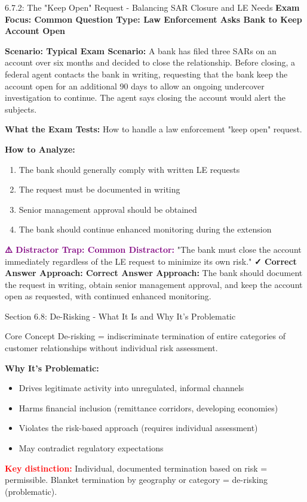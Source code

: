 \documentclass[11pt,a4paper]{beamer}
\newcommand{\redflag}[1]{\textcolor{red}{\textbf{#1}}}
\newcommand{\examfocus}[1]{\textcolor{orange!80!black}{\textbf{Exam Focus: #1}}}
\newcommand{\trap}[1]{\textcolor{purple}{\textbf{⚠️ Distractor Trap: #1}}}
\newcommand{\correct}[1]{\textcolor{green!50!black}{\textbf{✓ Correct Answer Approach: #1}}}
\newcommand{\scenario}[1]{\textcolor{blue!70!black}{\textbf{Scenario: #1}}}
\begin{document}
	\begin{frame}{6.7.2: The "Keep Open" Request - Balancing SAR Closure and LE Needs}
		\examfocus{Common Question Type: Law Enforcement Asks Bank to Keep Account Open}
		
		\scenario{Typical Exam Scenario:}
		A bank has filed three SARs on an account over six months and decided to close the relationship. Before closing, a federal agent contacts the bank in writing, requesting that the bank keep the account open for an additional 90 days to allow an ongoing undercover investigation to continue. The agent says closing the account would alert the subjects.
		
		\textbf{What the Exam Tests:} How to handle a law enforcement "keep open" request.
		
		\textbf{How to Analyze:}
		\begin{enumerate}
			\item The bank should generally comply with written LE requests
			\item The request must be documented in writing
			\item Senior management approval should be obtained
			\item The bank should continue enhanced monitoring during the extension
		\end{enumerate}
		
		\trap{Common Distractor:} "The bank must close the account immediately regardless of the LE request to minimize its own risk."
		\correct{Correct Answer Approach:} The bank should document the request in writing, obtain senior management approval, and keep the account open as requested, with continued enhanced monitoring.
	\end{frame}
	
	
	\begin{frame}{Section 6.8: De-Risking - What It Is and Why It's Problematic}
		\begin{block}{Core Concept}
			De-risking = indiscriminate termination of entire categories of customer relationships without individual risk assessment.
		\end{block}
		\textbf{Why It's Problematic:}
		\begin{itemize}
			\item Drives legitimate activity into unregulated, informal channels
			\item Harms financial inclusion (remittance corridors, developing economies)
			\item Violates the risk-based approach (requires individual assessment)
			\item May contradict regulatory expectations
		\end{itemize}
		\redflag{Key distinction:} Individual, documented termination based on risk = permissible. Blanket termination by geography or category = de-risking (problematic).
	\end{frame}
	
\end{document}
